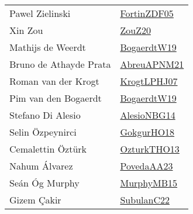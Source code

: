 {\begin{longtable}{p{4cm}p{20cm}}
Pawel Zielinski & \href{papers/FortinZDF05.pdf}{FortinZDF05}\cite{FortinZDF05} \\
Xin Zou & \href{}{ZouZ20}\cite{ZouZ20} \\
Mathijs de Weerdt & \href{papers/BogaerdtW19.pdf}{BogaerdtW19}\cite{BogaerdtW19} \\
Bruno de Athayde Prata & \href{}{AbreuAPNM21}\cite{AbreuAPNM21} \\
Roman van der Krogt & \href{papers/KrogtLPHJ07.pdf}{KrogtLPHJ07}\cite{KrogtLPHJ07} \\
Pim van den Bogaerdt & \href{papers/BogaerdtW19.pdf}{BogaerdtW19}\cite{BogaerdtW19} \\
Stefano {Di Alesio} & \href{papers/AlesioNBG14.pdf}{AlesioNBG14}\cite{AlesioNBG14} \\
Selin {\"{O}}zpeynirci & \href{}{GokgurHO18}\cite{GokgurHO18} \\
Cemalettin {\"{O}}zt{\"{u}}rk & \href{articles/OzturkTHO13.pdf}{OzturkTHO13}\cite{OzturkTHO13} \\
Nahum {\'{A}}lvarez & \href{papers/PovedaAA23.pdf}{PovedaAA23}\cite{PovedaAA23} \\
Se{\'{a}}n {\'{O}}g Murphy & \href{papers/MurphyMB15.pdf}{MurphyMB15}\cite{MurphyMB15} \\
Gizem {\c{C}}akir & \href{articles/SubulanC22.pdf}{SubulanC22}\cite{SubulanC22} \\
\end{longtable}
}

